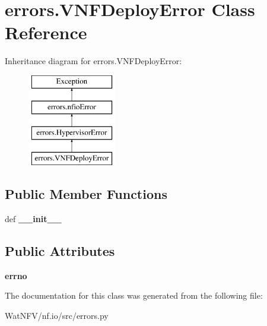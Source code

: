 \hypertarget{classerrors_1_1VNFDeployError}{\section{errors.\-V\-N\-F\-Deploy\-Error Class Reference}
\label{classerrors_1_1VNFDeployError}
}
Inheritance diagram for errors.\-V\-N\-F\-Deploy\-Error\-:\begin{figure}[H]
\begin{center}
\leavevmode
\includegraphics[height=4.000000cm]{classerrors_1_1VNFDeployError}
\end{center}
\end{figure}
\subsection*{Public Member Functions}
\begin{DoxyCompactItemize}
\item 
\hypertarget{classerrors_1_1VNFDeployError_a0c9aa66d6c3ea4936ee8395f04704a49}{def {\bfseries \-\_\-\-\_\-init\-\_\-\-\_\-}}\label{classerrors_1_1VNFDeployError_a0c9aa66d6c3ea4936ee8395f04704a49}

\end{DoxyCompactItemize}
\subsection*{Public Attributes}
\begin{DoxyCompactItemize}
\item 
\hypertarget{classerrors_1_1VNFDeployError_ad0add55d5e569b624981a36ada90804b}{{\bfseries errno}}\label{classerrors_1_1VNFDeployError_ad0add55d5e569b624981a36ada90804b}

\end{DoxyCompactItemize}


The documentation for this class was generated from the following file\-:\begin{DoxyCompactItemize}
\item 
Wat\-N\-F\-V/nf.\-io/src/errors.\-py\end{DoxyCompactItemize}
